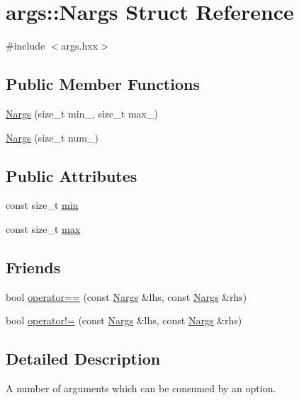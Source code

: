 \hypertarget{structargs_1_1_nargs}{}\section{args\+:\+:Nargs Struct Reference}
\label{structargs_1_1_nargs}


{\ttfamily \#include $<$args.\+hxx$>$}

\subsection*{Public Member Functions}
\begin{DoxyCompactItemize}
\item 
\hyperlink{structargs_1_1_nargs_a90438011275ec1ed792dabb6e47d5f05}{Nargs} (size\+\_\+t min\+\_\+, size\+\_\+t max\+\_\+)
\item 
\hyperlink{structargs_1_1_nargs_aed8011e8041269c28e11ebbe36607395}{Nargs} (size\+\_\+t num\+\_\+)
\end{DoxyCompactItemize}
\subsection*{Public Attributes}
\begin{DoxyCompactItemize}
\item 
const size\+\_\+t \hyperlink{structargs_1_1_nargs_accb94d349138f6b760ace606204df756}{min}
\item 
const size\+\_\+t \hyperlink{structargs_1_1_nargs_a03905b656f58dd338a7d65f801694b16}{max}
\end{DoxyCompactItemize}
\subsection*{Friends}
\begin{DoxyCompactItemize}
\item 
bool \hyperlink{structargs_1_1_nargs_ade1401f3b2f06774e60f90614702d930}{operator==} (const \hyperlink{structargs_1_1_nargs}{Nargs} \&lhs, const \hyperlink{structargs_1_1_nargs}{Nargs} \&rhs)
\item 
bool \hyperlink{structargs_1_1_nargs_acf6ad66d603f4d8e782de5833d9360ab}{operator!=} (const \hyperlink{structargs_1_1_nargs}{Nargs} \&lhs, const \hyperlink{structargs_1_1_nargs}{Nargs} \&rhs)
\end{DoxyCompactItemize}


\subsection{Detailed Description}
A number of arguments which can be consumed by an option.

